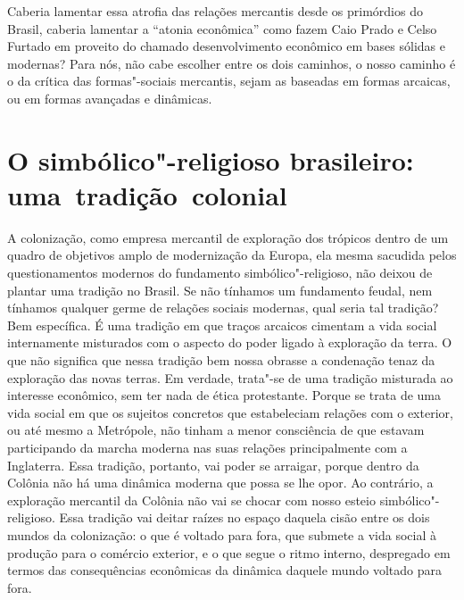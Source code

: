 {Caberia lamentar essa atrofia das relações mercantis desde os primórdios
do Brasil, caberia lamentar a ``atonia econômica'' como fazem Caio Prado
e Celso Furtado em proveito do chamado desenvolvimento econômico em
bases sólidas e modernas? Para nós, não cabe escolher entre os dois
caminhos, o nosso caminho é o da crítica das formas"-sociais mercantis,
sejam as baseadas em formas arcaicas, ou em formas avançadas e
dinâmicas.

\section{O simbólico"-religioso brasileiro: uma~tradição~colonial}

A colonização, como empresa mercantil de exploração dos trópicos dentro
de um quadro de objetivos amplo de modernização da Europa, ela mesma
sacudida pelos questionamentos modernos do fundamento
simbólico"-religioso, não deixou de plantar uma tradição no Brasil. Se
não tínhamos um fundamento feudal, nem tínhamos qualquer germe de
relações sociais modernas, qual seria tal tradição? Bem específica. É
uma tradição em que traços arcaicos cimentam a vida social internamente
misturados com o aspecto do poder ligado à exploração da terra. O que
não significa que nessa tradição bem nossa obrasse a condenação tenaz da
exploração das novas terras. Em verdade, trata"-se de uma tradição
misturada ao interesse econômico, sem ter nada de ética protestante.
Porque se trata de uma vida social em que os sujeitos concretos que
estabeleciam relações com o exterior, ou até mesmo a Metrópole, não
tinham a menor consciência de que estavam participando da marcha moderna
nas suas relações principalmente com a Inglaterra. Essa tradição,
portanto, vai poder se arraigar, porque dentro da Colônia não há uma
dinâmica moderna que possa se lhe opor. Ao contrário, a exploração
mercantil da Colônia não vai se chocar com nosso esteio
simbólico"-religioso. Essa tradição vai deitar raízes no espaço daquela
cisão entre os dois mundos da colonização: o que é voltado para fora,
que submete a vida social à produção para o comércio exterior, e o que
segue o ritmo interno, despregado em termos das consequências econômicas
da dinâmica daquele mundo voltado para fora.

}
